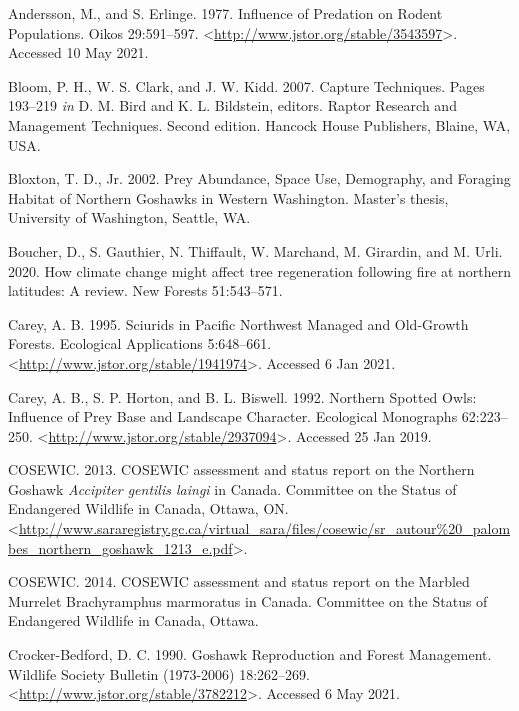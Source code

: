 \documentclass{sfuthesis}
\begin{document}
\leavevmode\hypertarget{ref-andersson_influence_1977}{}%
Andersson, M., and S. Erlinge. 1977. Influence of Predation on Rodent Populations. Oikos 29:591--597. \textless{}\url{http://www.jstor.org/stable/3543597}\textgreater. Accessed 10 May 2021.

\leavevmode\hypertarget{ref-bloom_capture_2007}{}%
Bloom, P. H., W. S. Clark, and J. W. Kidd. 2007. Capture Techniques. Pages 193--219 \emph{in} D. M. Bird and K. L. Bildstein, editors. Raptor Research and Management Techniques. Second edition. Hancock House Publishers, Blaine, WA, USA.

\leavevmode\hypertarget{ref-bloxton_prey_2002}{}%
Bloxton, T. D., Jr. 2002. Prey Abundance, Space Use, Demography, and Foraging Habitat of Northern Goshawks in Western Washington. Master's thesis, University of Washington, Seattle, WA.

\leavevmode\hypertarget{ref-boucher_how_2020}{}%
Boucher, D., S. Gauthier, N. Thiffault, W. Marchand, M. Girardin, and M. Urli. 2020. How climate change might affect tree regeneration following fire at northern latitudes: A review. New Forests 51:543--571.

\leavevmode\hypertarget{ref-carey_sciurids_1995}{}%
Carey, A. B. 1995. Sciurids in Pacific Northwest Managed and Old-Growth Forests. Ecological Applications 5:648--661. \textless{}\url{http://www.jstor.org/stable/1941974}\textgreater. Accessed 6 Jan 2021.

\leavevmode\hypertarget{ref-carey_northern_1992}{}%
Carey, A. B., S. P. Horton, and B. L. Biswell. 1992. Northern Spotted Owls: Influence of Prey Base and Landscape Character. Ecological Monographs 62:223--250. \textless{}\url{http://www.jstor.org/stable/2937094}\textgreater. Accessed 25 Jan 2019.

\leavevmode\hypertarget{ref-cosewic_cosewic_2013}{}%
COSEWIC. 2013. COSEWIC assessment and status report on the Northern Goshawk \emph{Accipiter gentilis laingi} in Canada. Committee on the Status of Endangered Wildlife in Canada, Ottawa, ON. \textless{}\url{http://www.sararegistry.gc.ca/virtual_sara/files/cosewic/sr_autour\%20_palombes_northern_goshawk_1213_e.pdf}\textgreater.

\leavevmode\hypertarget{ref-cosewic_cosewic_2014}{}%
COSEWIC. 2014. COSEWIC assessment and status report on the Marbled Murrelet Brachyramphus marmoratus in Canada. Committee on the Status of Endangered Wildlife in Canada, Ottawa.

\leavevmode\hypertarget{ref-crocker-bedford_goshawk_1990}{}%
Crocker-Bedford, D. C. 1990. Goshawk Reproduction and Forest Management. Wildlife Society Bulletin (1973-2006) 18:262--269. \textless{}\url{http://www.jstor.org/stable/3782212}\textgreater. Accessed 6 May 2021.
\end{document}
